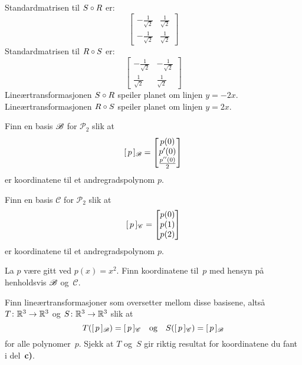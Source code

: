 \begin{losning}
Standardmatrisen til $S \circ R$ er:
\[
\begin{bmatrix}
-\frac{1}{\sqrt{2}} & \frac{1}{\sqrt{2}} \\
-\frac{1}{\sqrt{2}}  & \frac{1}{\sqrt{2}} 
\end{bmatrix}
\]
Standardmatrisen til $R \circ S$ er:
\[
\begin{bmatrix}
-\frac{1}{\sqrt{2}} & -\frac{1}{\sqrt{2}} \\
\frac{1}{\sqrt{2}}  & \frac{1}{\sqrt{2}} 
\end{bmatrix}
\]
Lineærtransformasjonen $S \circ R$ speiler planet om linjen
$y = -2x$.
Lineærtransformasjonen $R \circ S$ speiler planet om linjen
$y = 2x$.
\end{losning}


\begin{oppgave}
\begin{punkt}
Finn en basis $\mathscr{B}$ for $\mathcal{P}_2$ slik at
\[
[\,{p}\,]_{\mathscr{B}}
 =
\begin{bmatrix} p(0) \\ p'(0) \\ \frac{p''(0)}{2} \end{bmatrix}
\]
er koordinatene til et andregradspolynom $p$.
\end{punkt}

\begin{punkt}
Finn en basis $\mathscr{C}$ for $\mathcal{P}_2$ slik at
\[
[\,{p}\,]_{\mathscr{C}}
 =
\begin{bmatrix} p(0) \\ p(1) \\ p(2) \end{bmatrix}
\]
er koordinatene til et andregradspolynom $p$.
\end{punkt}

\begin{punkt}
La $p$ være gitt ved $p(x) = x^2$.
Finn koordinatene til~$p$ med hensyn på henholdsvis $\mathscr{B}$ og~$\mathscr{C}$.
\end{punkt}

\begin{punkt}
Finn lineærtransformasjoner som oversetter mellom disse basisene,
altså
$T \colon \mathbb{R}^3 \to \mathbb{R}^3$ og
$S \colon \mathbb{R}^3 \to \mathbb{R}^3$
slik at
\[
T( [\,{p}\,]_{\mathscr{B}} ) = [\,{p}\,]_{\mathscr{C}}
\quad\text{og}\quad
S( [\,{p}\,]_{\mathscr{C}} ) = [\,{p}\,]_{\mathscr{B}}
\]
for alle polynomer~$p$.
Sjekk at $T$ og~$S$ gir riktig resultat for koordinatene du fant i
del~\textbf{c)}.
\end{punkt}

\end{oppgave}

